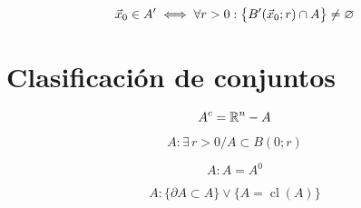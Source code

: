 \begin{mdframed}[style=DefinitionFrame]
    \begin{defn}
        \label{defn:limitPoint}
    \end{defn}
    \begin{equation*}
        \Vec{x}_0 \in A' \iff \forall r>0 : \big\{ B'(\Vec{x}_0;r) \cap A \big\} \neq \varnothing
    \end{equation*}
\end{mdframed}


\section{Clasificación de conjuntos}

\begin{mdframed}[style=DefinitionFrame]
    \begin{defn}
    \end{defn}
    \begin{equation*}
        A^c = \mathbb{R}^n - A
    \end{equation*}
\end{mdframed}

\begin{mdframed}[style=DefinitionFrame]
    \begin{defn}
    \end{defn}
    \begin{equation*}
        A: \exists \, r>0 / A \subset B(0;r)
    \end{equation*}
\end{mdframed}

\begin{mdframed}[style=DefinitionFrame]
    \begin{defn}
    \end{defn}
    \begin{equation*}
        A: A=A^0
    \end{equation*}
\end{mdframed}

\begin{mdframed}[style=DefinitionFrame]
    \begin{defn}
    \end{defn}
    \begin{equation*}
        A: \big\{ \partial A \subset A \big\} \lor \big\{ A=\operatorname{cl}(A) \big\}
    \end{equation*}
\end{mdframed}

